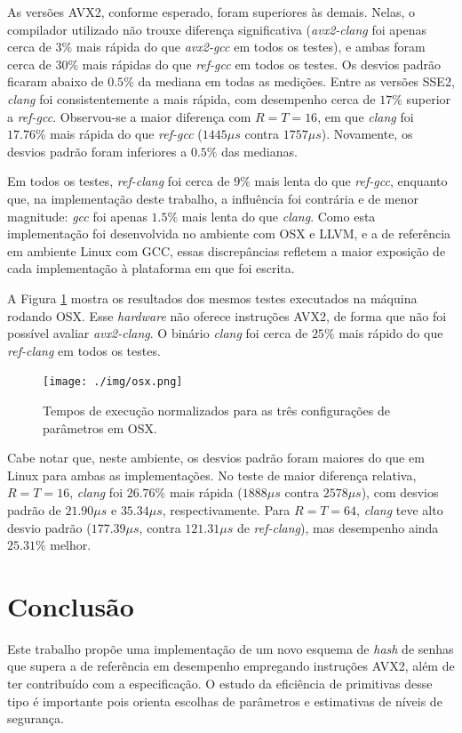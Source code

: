 \documentclass{article}
\begin{document}
As versões AVX2, conforme esperado, foram superiores às demais. Nelas, o
compilador utilizado não trouxe diferença significativa (\emph{avx2-clang} foi
apenas cerca de $3\%$ mais rápida do que \emph{avx2-gcc} em todos os testes), e
ambas foram cerca de $30\%$ mais rápidas do que \emph{ref-gcc} em todos os
testes. Os desvios padrão ficaram abaixo de $0.5\%$ da mediana em todas as
medições.
%
Entre as versões SSE2, \emph{clang} foi consistentemente a mais rápida, com
desempenho cerca de $17\%$ superior a \emph{ref-gcc}. Observou-se a maior
diferença com $R = T = 16$, em que \emph{clang} foi $17.76\%$ mais rápida do
que \emph{ref-gcc} ($1445 \mu s$ contra $1757 \mu s$). Novamente, os desvios
padrão foram inferiores a $0.5\%$ das medianas.

Em todos os testes, \emph{ref-clang} foi cerca de $9\%$ mais lenta do que
\emph{ref-gcc}, enquanto que, na implementação deste trabalho, a influência foi
contrária e de menor magnitude: \emph{gcc} foi apenas $1.5\%$ mais lenta do que
\emph{clang}. Como esta implementação foi desenvolvida no ambiente com OSX e
LLVM, e a de referência em ambiente Linux com GCC, essas discrepâncias refletem
a maior exposição de cada implementação à plataforma em que foi escrita.

A Figura \ref{results-osx} mostra os resultados dos mesmos testes executados na
máquina rodando OSX. Esse \emph{hardware} não oferece instruções AVX2, de forma
que não foi possível avaliar \emph{avx2-clang}. O binário \emph{clang} foi
cerca de $25\%$ mais rápido do que \emph{ref-clang} em todos os testes.

\begin{figure}[htbp]
\centering
\texttt{[image: ./img/osx.png]}
\caption{Tempos de execução normalizados para as três configurações de
parâmetros em OSX\label{results-osx}.}
\end{figure}

Cabe notar que, neste ambiente, os desvios padrão foram maiores do que em Linux
para ambas as implementações. No teste de maior diferença relativa, $R = T =
16$, \emph{clang} foi $26.76\%$ mais rápida ($1888 \mu s$ contra $2578 \mu s$),
com desvios padrão de $21.90 \mu s$ e $35.34 \mu s$, respectivamente. Para $R =
T = 64$, \emph{clang} teve alto desvio padrão ($177.39 \mu s$, contra $121.31
\mu s$ de \emph{ref-clang}), mas desempenho ainda $25.31\%$ melhor.

\section{Conclusão}

Este trabalho propõe uma implementação de um novo esquema de \emph{hash} de
senhas que supera a de referência em desempenho empregando instruções AVX2,
além de ter contribuído com a especificação. O estudo da eficiência de
primitivas desse tipo é importante pois orienta escolhas de parâmetros e
estimativas de níveis de segurança.



\end{document}
